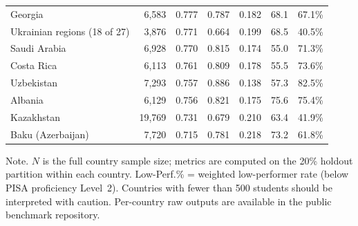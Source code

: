 \begin{table}[!t]
\begin{tabular}{@{}lrrrrrr@{}}
Georgia & 6,583 & 0.777 & 0.787 & 0.182 & 68.1 & 67.1\% \\
Ukrainian regions (18 of 27) & 3,876 & 0.771 & 0.664 & 0.199 & 68.5 & 40.5\% \\
Saudi Arabia & 6,928 & 0.770 & 0.815 & 0.174 & 55.0 & 71.3\% \\
Costa Rica & 6,113 & 0.761 & 0.809 & 0.178 & 55.5 & 73.6\% \\
Uzbekistan & 7,293 & 0.757 & 0.886 & 0.138 & 57.3 & 82.5\% \\
Albania & 6,129 & 0.756 & 0.821 & 0.175 & 75.6 & 75.4\% \\
Kazakhstan & 19,769 & 0.731 & 0.679 & 0.210 & 63.4 & 41.9\% \\
Baku (Azerbaijan) & 7,720 & 0.715 & 0.781 & 0.218 & 73.2 & 61.8\% \\
\bottomrule
\end{tabular}
\begin{tablenotes}
\item Note. $N$ is the full country sample size; metrics are computed on the 20\% holdout partition within each country. Low-Perf.\% = weighted low-performer rate (below PISA proficiency Level~2). Countries with fewer than 500 students should be interpreted with caution. Per-country raw outputs are available in the public benchmark repository.
\end{tablenotes}
\end{table}
